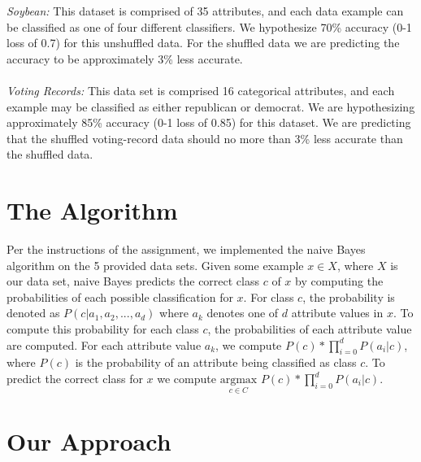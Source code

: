 \documentclass[twoside,11pt]{article}
\begin{document}
\textit{Soybean:} This dataset is comprised of 35 attributes, and each data example can be classified as one of four different classifiers. We hypothesize 70\% accuracy (0-1 loss of 0.7) for this unshuffled data. For the shuffled data we are predicting the accuracy to be approximately 3\% less accurate.\\ \\
\textit{Voting Records:} This data set is comprised 16 categorical attributes, and each example may be classified as either republican or democrat. We are hypothesizing approximately 85\% accuracy (0-1 loss of 0.85) for this dataset. We are predicting that the shuffled voting-record data should no more than 3\% less accurate than the shuffled data.\\

\section{The Algorithm}
Per the instructions of the assignment, we implemented the naive Bayes algorithm on the 5 provided data sets. Given some example $x \in X$, where $X$ is our data set, naive Bayes predicts the correct class $c$ of $x$ by computing the probabilities of each possible classification for $x$. For class $c$, the probability is denoted as $P(c | a_1, a_2,...,a_d)$ where $a_k$ denotes one of $d$ attribute values in $x$. To compute this probability for each class $c$, the probabilities of each attribute value are computed. For each attribute value $a_k$, we compute $P(c) * \prod^d_{i=0} P(a_i | c)$, where $P(c)$ is the probability of an attribute being classified as class $c$. To predict the correct class for $x$ we compute $\underset{c \in C}{\mathrm{argmax}}$ $P(c) * \prod^d_{i=0} P(a_i | c)$.

\section{Our Approach}
\end{document}
